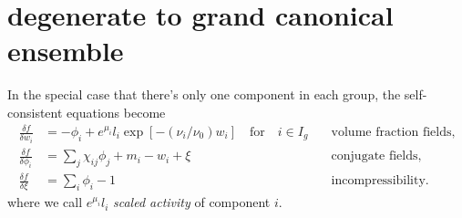 \documentclass[aps,prl,reprint,onecolumn,groupedaddress,amsmath,amssymb]{revtex4-2}
\begin{document}
\section{degenerate to grand canonical ensemble}
In the special case that there's only one component in each group, the self-consistent equations become
\begin{subequations}
    \begin{align}
        \frac{\delta f}{\delta w_i}    & = -\phi_i + e^{\mu_i} l_i \exp\left[-\left(\nu_i/\nu_0\right) w_i\right]  \quad \text{for} \quad i\in I_g \quad & \text{volume fraction fields,} \\
        \frac{\delta f}{\delta \phi_i} & = \sum_j \chi_{ij} \phi_j + m_i -w_i + \xi     \quad                                                            & \text{conjugate fields,}       \\
        \frac{\delta f}{\delta \xi}    & = \sum_i \phi_i -1     \quad                                                                                    & \text{incompressibility.}
    \end{align}
\end{subequations}
where we call $e^{\mu_i} l_i$ \emph{scaled activity} of component $i$.
\end{document}

